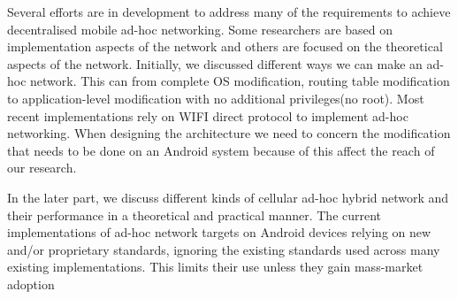 \vspace{12pt}
Several efforts are in development to address many of the requirements to achieve decentralised mobile ad-hoc networking. Some researchers are based on implementation aspects of the network and others are focused on the theoretical aspects of the network.
\vspace{12pt}
Initially, we discussed different ways we can make an ad-hoc network. This can from complete OS modification, routing table modification to application-level modification with no additional privileges(no root). Most recent implementations rely on WIFI  direct protocol to implement ad-hoc networking. When designing the architecture we need to concern the modification that needs to be done on an Android system because of this affect the reach of our research.


\vspace{12pt}

In the later part, we discuss different kinds of cellular ad-hoc hybrid network and their performance in a theoretical and practical manner. The current implementations of ad-hoc network targets on Android devices relying on new and/or proprietary standards, ignoring the existing standards used across many existing implementations. This limits their use unless they gain mass-market adoption


\vspace{12pt}

\pagebreak












